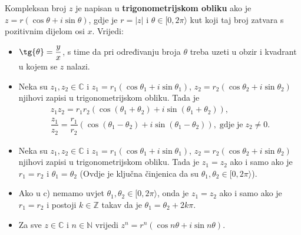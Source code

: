\begin{remark}
\label{cmplxproperties}
Kompleksan broj \(z\) je napisan u \textbf{trigonometrijskom obliku} ako je \(z=r(\cos{\theta}+i\sin{\theta})\), gdje je \(r=|z|\) i \(\theta\in [0, 2\pi \rangle\) kut koji taj broj zatvara s pozitivnim dijelom osi \(x\). Vrijedi:
\begin{itemize}
\item[a)] \(\tg{\theta}=\dfrac{y}{x}\), s time da pri određivanju broja \(\theta\) treba uzeti u obzir i kvadrant u kojem se \(z\) nalazi.
\item[b)] Neka su $z_1, z_2\in \mathbb{C}$ i \(z_1=r_1(\cos{\theta_1}+i\sin{\theta_1})\), \(z_2=r_2(\cos{\theta_2}+i\sin{\theta_2})\) njihovi zapisi u trigonometrijskom obliku. Tada je
\begin{gather*}
z_1z_2=r_1r_2\left(\cos(\theta_1+\theta_2)+i\sin(\theta_1+\theta_2)\right),\\
\dfrac{z_1}{z_2}=\dfrac{r_1}{r_2}\left(\cos(\theta_1-\theta_2)+i\sin(\theta_1-\theta_2)\right), \;\mathrm{gdje}\;\mathrm{je}\; z_2\neq 0.
\end{gather*}
\item[c)] Neka su $z_1, z_2\in \mathbb{C}$ i \(z_1=r_1(\cos{\theta_1}+i\sin{\theta_1})\), \(z_2=r_2(\cos{\theta_2}+i\sin{\theta_2})\) njihovi zapisi u trigonometrijskom obliku. Tada je $z_1=z_2$ ako i samo ako je $r_1=r_2$ i $\theta_1=\theta_2$ (Ovdje je ključna činjenica da su $\theta_1, \theta_2 \in [0, 2\pi\rangle$).
\item[d)] Ako u c) nemamo uvjet $\theta_1, \theta_2 \in [0, 2\pi\rangle$, onda je $z_1=z_2$ ako i samo ako je $r_1=r_2$ i postoji $k\in \mathbb{Z}$ takav da je $\theta_1=\theta_2+2k\pi$.
\item[e)] Za sve \(z\in \mathbb{C}\) i \(n\in \mathbb{N}\) vrijedi \(z^n=r^n(\cos{n\theta}+i\sin{n\theta})\).
\end{itemize}
\end{remark}

